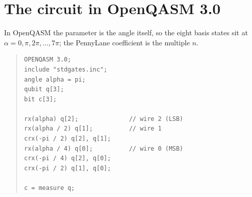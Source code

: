 \documentclass[11pt,a4paper]{article}
\theoremstyle{plain}
\theoremstyle{definition}
\theoremstyle{remark}
\begin{document}
\section{The circuit in OpenQASM 3.0}

In OpenQASM the parameter is the angle itself, so the eight basis states sit at
$\alpha = 0,\pi,2\pi,\dots,7\pi$; the PennyLane coefficient is the multiple $n$.
\begin{quote}\small
\begin{verbatim}
OPENQASM 3.0;
include "stdgates.inc";
angle alpha = pi;
qubit q[3];
bit c[3];

rx(alpha) q[2];              // wire 2 (LSB)
rx(alpha / 2) q[1];          // wire 1
crx(-pi / 2) q[2], q[1];
rx(alpha / 4) q[0];          // wire 0 (MSB)
crx(-pi / 4) q[2], q[0];
crx(-pi / 2) q[1], q[0];

c = measure q;
\end{verbatim}
\end{quote}
\end{document}
